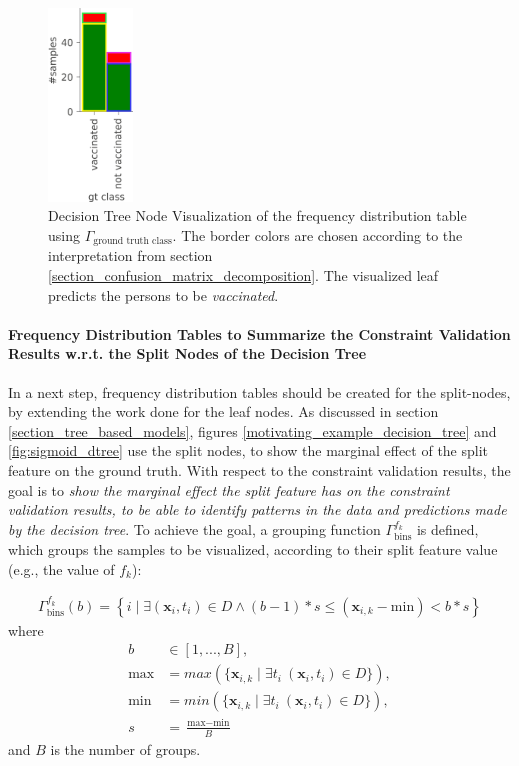 \begin{figure}
    \centering
    \includegraphics[width=0.2\textwidth]{images/visualizations/leaf_gt_viz.png}
    \caption{Decision Tree Node Visualization of the frequency distribution table using $\Gamma_\text{ground truth class}$. The border colors are chosen according to the interpretation from section \ref{section_confusion_matrix_decomposition}. The visualized leaf predicts the persons to be \emph{vaccinated}.}
    \label{fig:decision_tree_node_gt_viz}
\end{figure}


\paragraph{Frequency Distribution Tables to Summarize the Constraint Validation Results w.r.t. the Split Nodes of the Decision Tree} 

In a next step, frequency distribution tables should be created for the split-nodes, by extending the work done for the leaf nodes. As discussed in section \ref{section_tree_based_models}, figures \ref{motivating_example_decision_tree} and \ref{fig:sigmoid_dtree} use the split nodes, to show the marginal effect of the split feature on the ground truth. With respect to the constraint validation results, the goal is to \emph{show the marginal effect the split feature has on the constraint validation results, to be able to identify patterns in the data and predictions made by the decision tree}. To achieve the goal, a grouping function $\Gamma_\text{bins}^{f_k}$ is defined, which groups the samples to be visualized, according to their split feature value (e.g., the value of $f_k$):

\begin{gather}
    \Gamma_\text{bins}^{f_k}(b) = \left\{i \mid \exists (\mathbf{x}_i,t_i) \in D \land (b-1) * s \leq (\mathbf{x}_{i,k} - \textrm{min}) < b * s  \right\}
\end{gather}
where
\begin{align*}
    b & \in [1,...,B], \\
    \textrm{max} & = max(\{ \mathbf{x}_{i,k} \mid \exists t_i ~ (\mathbf{x}_i,t_i) \in D\}),\\
    \textrm{min} & = min(\{ \mathbf{x}_{i,k} \mid \exists t_i ~ (\mathbf{x}_i,t_i) \in D\}),\\
    s & = \frac{\textrm{max} - \textrm{min}}{B}
\end{align*}
and $B$ is the number of groups. 

